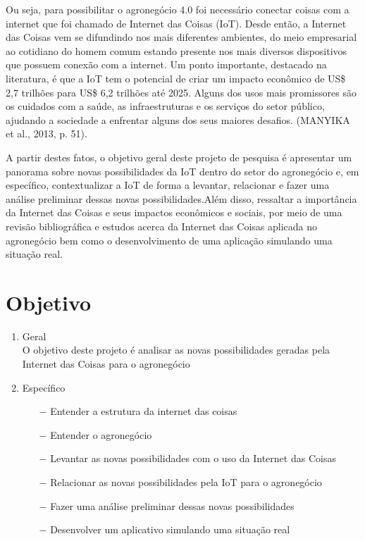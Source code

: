 \documentclass[eso]{bcc}
\begin{document}
Ou seja, para possibilitar o agronegócio 4.0 foi necessário conectar coisas com a internet que 
foi chamado de Internet das Coisas (IoT). Desde então, a Internet das Coisas vem se difundindo 
nos mais diferentes ambientes, do meio empresarial ao cotidiano do homem comum estando presente 
nos mais diversos dispositivos que possuem conexão com a internet. Um ponto importante, 
destacado na literatura, é que a IoT tem o potencial de criar um impacto econômico de 
US\$ 2,7 trilhões para US\$ 6,2 trilhões até 2025. Alguns dos usos mais promissores são os 
cuidados com a saúde, as infraestruturas e os serviços do setor público, ajudando a sociedade 
a enfrentar alguns dos seus maiores desafios. (MANYIKA et al., 2013, p. 51).

A partir destes fatos, o objetivo geral deste projeto de pesquisa é apresentar um panorama 
sobre novas possibilidades da IoT dentro do setor do agronegócio e, em específico, 
contextualizar a IoT de forma a levantar, relacionar e fazer uma análise preliminar dessas 
novas possibilidades.Além disso, ressaltar  a  importância  da Internet das Coisas e seus 
impactos econômicos e sociais,  por meio de uma revisão bibliográfica e estudos acerca da 
Internet das Coisas aplicada no agronegócio bem como o desenvolvimento de uma aplicação 
simulando uma situação real.


\section{Objetivo}

\begin{enumerate}
    \item Geral\\
    O objetivo deste projeto é analisar as novas possibilidades geradas pela Internet das Coisas para o agronegócio
    \item Específico
    \begin{enumerate}
        \item[$-$]  Entender a estrutura da internet das coisas
        \item[$-$] Entender o agronegócio
        \item[$-$] Levantar as novas possibilidades com o uso da Internet das Coisas
        \item[$-$] Relacionar as novas possibilidades pela IoT para o agronegócio 
        \item[$-$] Fazer uma análise preliminar dessas novas possibilidades
        \item[$-$] Desenvolver um aplicativo simulando uma situação real
    \end{enumerate}
\end{enumerate}
\end{document}
